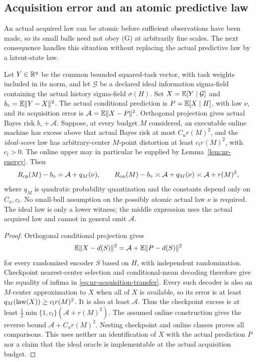 \subsection{Acquisition error and an atomic predictive law}
An actual acquired law can be atomic before sufficient observations have been made, so its small balls need not obey \textup{(G)} at arbitrarily fine scales. The next consequence handles this situation without replacing the actual predictive law by a latent-state law.

\begin{proposition}\label{prop:nr-acquisition}
Let $Y\in\mathbb R^q$ be the common bounded squared-task vector, with task weights included in its norm, and let $\mathcal G$ be a declared ideal information sigma-field containing the actual history sigma-field $\sigma(H)$. Set $X=\mathbb E[Y\mid\mathcal G]$ and $b_\circ=\mathbb E\|Y-X\|^2$. The actual conditional prediction is $P=\mathbb E[X\mid H]$, with law $\nu$, and its acquisition error is $\mathcal A=\mathbb E\|X-P\|^2$. Orthogonal projection gives actual Bayes risk $b_\circ+\mathcal A$. Suppose, at every budget $M$ considered, an executable online machine has excess above that actual Bayes risk at most $C_ur(M)^2$, and the \emph{ideal-score} law has arbitrary-center $M$-point distortion at least $c_lr(M)^2$, with $c_l>0$. The online upper may in particular be supplied by Lemma~\ref{lem:nr-energy}. Then
\begin{equation}\label{eq:nr-acquisition-transfer}
 R_{\mathrm{cp}}(M)-b_\circ=\mathcal A+q_M(\nu),\qquad
 R_{\mathrm{on}}(M)-b_\circ\asymp\mathcal A+q_M(\nu)
                      \asymp\mathcal A+r(M)^2,
\end{equation}
where $q_M$ is quadratic probability quantization and the constants depend only on $C_u,c_l$. No small-ball assumption on the possibly atomic actual law $\nu$ is required. The ideal law is only a lower witness; the middle expression uses the actual acquired law and cannot in general omit $\mathcal A$.
\end{proposition}
\begin{proof}
Orthogonal conditional projection gives
\[
 \mathbb E\|X-d(S)\|^2=\mathcal A+\mathbb E\|P-d(S)\|^2
\]
for every randomized encoder $S$ based on $H$, with independent randomization. Checkpoint nearest-center selection and conditional-mean decoding therefore give the equality of infima in \eqref{eq:nr-acquisition-transfer}. Every such decoder is also an $M$-center approximation to $X$ when all of $X$ is available, so its error is at least $q_M(\operatorname{law}(X))\ge c_lr(M)^2$. It is also at least $\mathcal A$. Thus the checkpoint excess is at least $\tfrac12\min\{1,c_l\}(\mathcal A+r(M)^2)$. The assumed online construction gives the reverse bound $\mathcal A+C_ur(M)^2$. Nesting checkpoint and online classes proves all comparisons. This uses neither an identification of $X$ with the actual prediction $P$ nor a claim that the ideal oracle is implementable at the actual acquisition budget.
\end{proof}
